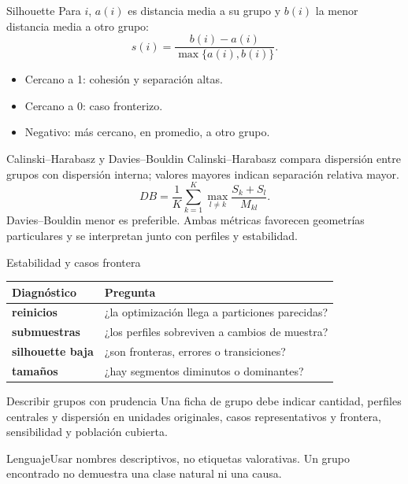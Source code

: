 \documentclass[aspectratio=169,10pt]{beamer}
\begin{document}
\begin{frame}{Silhouette}\small
Para $i$, $a(i)$ es distancia media a su grupo y $b(i)$ la menor distancia media a otro grupo:
\[s(i)=\frac{b(i)-a(i)}{\max\{a(i),b(i)\}}.\]
\begin{itemize}\item Cercano a 1: cohesión y separación altas.\item Cercano a 0: caso fronterizo.\item Negativo: más cercano, en promedio, a otro grupo.\end{itemize}
\end{frame}

\begin{frame}{Calinski--Harabasz y Davies--Bouldin}\small
Calinski--Harabasz compara dispersión entre grupos con dispersión interna; valores mayores indican separación relativa mayor.
\[DB=\frac{1}{K}\sum_{k=1}^{K}\max_{l\neq k}\frac{S_k+S_l}{M_{kl}}.\]
Davies--Bouldin menor es preferible. Ambas métricas favorecen geometrías particulares y se interpretan junto con perfiles y estabilidad.
\end{frame}

\begin{frame}{Estabilidad y casos frontera}\small
\begin{tabularx}{\textwidth}{>{\bfseries}p{}X}\toprule Diagnóstico & Pregunta\\\midrule reinicios & ¿la optimización llega a particiones parecidas?\\ submuestras & ¿los perfiles sobreviven a cambios de muestra?\\ silhouette baja & ¿son fronteras, errores o transiciones?\\ tamaños & ¿hay segmentos diminutos o dominantes?\\\bottomrule\end{tabularx}
\end{frame}

\begin{frame}{Describir grupos con prudencia}\small
Una ficha de grupo debe indicar cantidad, perfiles centrales y dispersión en unidades originales, casos representativos y frontera, sensibilidad y población cubierta.
\begin{alertblock}{Lenguaje}Usar nombres descriptivos, no etiquetas valorativas. Un grupo encontrado no demuestra una clase natural ni una causa.\end{alertblock}
\end{frame}
\end{document}
